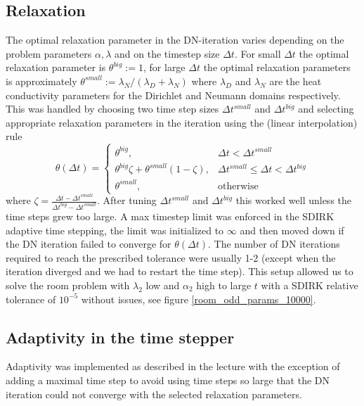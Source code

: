 \documentclass[]{article}
\begin{document}
\subsection{Relaxation}

The optimal relaxation parameter in the DN-iteration varies depending on the problem parameters $\alpha, \lambda$ and on the timestep size $\Delta t$. For small $\Delta t$ the optimal relaxation parameter is $\theta^{big} := 1$, for large $\Delta t$ the optimal relaxation parameters is approximately $ \theta^{small} := \lambda_N / ( \lambda_D + \lambda_N)$ where $\lambda_D$ and $\lambda_N$ are the heat conductivity parameters for the Dirichlet and Neumann domains respectively. This was handled by choosing two time step sizes $\Delta t^{small}$ and $\Delta t^{big}$ and selecting appropriate relaxation parameters in the iteration using the (linear interpolation) rule
\begin{equation}
    \theta(\Delta t) = \begin{cases}
    \theta^{big}, & \Delta t < \Delta t^{small} \\
    \theta^{big} \zeta + \theta^{small}(1-\zeta), & \Delta t^{small} \le \Delta t < \Delta t^{big} \\
    \theta^{small}, & \text{otherwise}
    \end{cases}
\end{equation}
where $\zeta=\frac{\Delta t - \Delta t^{small}}{\Delta t^{big} - \Delta t^{small}}$. After tuning $\Delta t^{small}$ and $\Delta t^{big}$ this worked well unless the time steps grew too large. A max timestep limit was enforced in the SDIRK adaptive time stepping, the limit was initialized to $\infty$ and then moved down if the DN iteration failed to converge for $\theta(\Delta t)$. The number of DN iterations required to reach the prescribed tolerance were usually 1-2 (except when the iteration diverged and we had to restart the time step). This setup allowed us to solve the room problem with $\lambda_2$ low and $\alpha_2$ high to large $t$ with a SDIRK relative tolerance of $10^{-5}$ without issues, see figure \ref{room_odd_params_10000}.

\subsection{Adaptivity in the time stepper}
Adaptivity was implemented as described in the lecture with the exception of adding a maximal time step to avoid using time steps so large that the DN iteration could not converge with the selected relaxation parameters.
\end{document}

